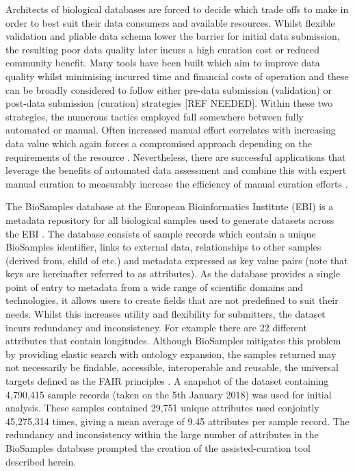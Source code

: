 \documentclass{bmcart}
\begin{document}
Architects of biological databases are forced to decide which trade offs to make in order to best suit their data consumers and available resources. Whilst flexible validation and pliable data schema lower the barrier for initial data submission, the resulting poor data quality later incurs a high curation cost or reduced community benefit. Many tools have been built which aim to improve data quality whilst minimising incurred time and financial costs of operation and these can be broadly considered to follow either pre-data submission (validation) or post-data submission (curation) strategies [REF NEEDED]. Within these two strategies, the numerous tactics employed fall somewhere between fully automated or manual. Often increased manual effort correlates with increasing data value which again forces a compromised approach depending on the requirements of the resource \cite{goble2008data}. Nevertheless, there are successful applications that leverage the benefits of automated data assessment and combine this with expert manual curation to measurably increase the efficiency of manual curation efforts \cite{salgado2012myminer, salimi2006biocurator, szostak2015construction}.

The BioSamples database at the European Bioinformatics Institute (EBI) is a metadata repository for all biological samples used to generate datasets across the EBI \cite{gostev2011biosample, faulconbridge2013updates}. The database consists of sample records which contain a unique BioSamples identifier, links to external data, relationships to other samples (derived from, child of etc.) and metadata expressed as key value pairs (note that keys are hereinafter referred to as attributes). As the database provides a single point of entry to metadata from a wide range of scientific domains and technologies, it allows users to create fields that are not predefined to suit their needs. Whilst this increases utility and flexibility for submitters, the dataset incurs redundancy and inconsistency. For example there are 22 different attributes that contain longitudes. Although BioSamples mitigates this problem by providing elastic search with ontology expansion, the samples returned may not necessarily be findable, accessible, interoperable and reusable, the universal targets defined as the FAIR principles \cite{wilkinson2016fair}. A snapshot of the dataset containing 4,790,415 sample records (taken on the 5th January 2018) was used for initial analysis. These samples contained 29,751 unique attributes used conjointly 45,275,314 times, giving a mean average of 9.45 attributes per sample record. The redundancy and inconsistency within the large number of attributes in the BioSamples database prompted the creation of the assisted-curation tool described herein.
\end{document}
